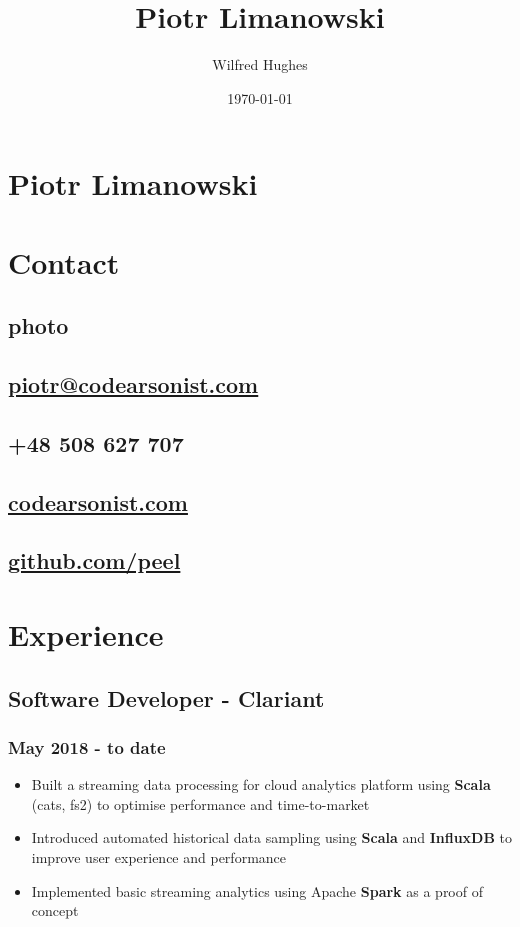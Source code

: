 \documentclass[11pt]{article}
\author{Wilfred Hughes}
\date{\today}
\title{Piotr Limanowski}
\begin{document}
\section*{Piotr Limanowski}
\label{sec:orgfe9b383}
\section*{Contact}
\label{sec:org52908c7}
\subsection*{photo}
\label{sec:orga9d87a0}
\subsection*{\href{mailto:piotr@codearsonist.com}{piotr@codearsonist.com}}
\label{sec:org21f3d46}
\subsection*{+48 508 627 707}
\label{sec:org3b62c95}
\subsection*{\href{https://codearsonist.com}{codearsonist.com}}
\label{sec:org4a0ba5f}
\subsection*{\href{https://github.com/peel}{github.com/peel}}
\label{sec:orgea104c4}
\section*{Experience}
\label{sec:orgcdd5b72}
\subsection*{Software Developer - Clariant}
\label{sec:orgb5966ec}
\subsubsection*{May 2018 - to date}
\label{sec:org03268a4}
\begin{itemize}
\item Built a streaming data processing for cloud analytics platform using \textbf{Scala} (cats, fs2) to optimise performance and time-to-market
\item Introduced automated historical data sampling using \textbf{Scala} and \textbf{InfluxDB} to improve user experience and performance
\item Implemented basic streaming analytics using Apache \textbf{Spark} as a proof of concept
\end{itemize}
\end{document}
